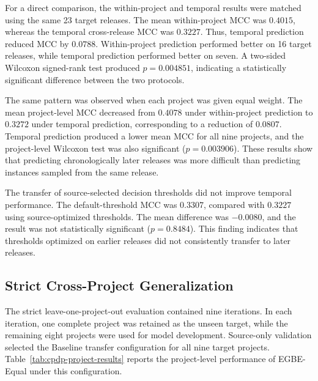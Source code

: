 \documentclass[conference]{IEEEtran}
\begin{document}
For a direct comparison, the within-project and temporal results were
matched using the same 23 target releases. The mean within-project MCC
was \(0.4015\), whereas the temporal cross-release MCC was \(0.3227\).
Thus, temporal prediction reduced MCC by \(0.0788\). Within-project
prediction performed better on 16 target releases, while temporal
prediction performed better on seven. A two-sided Wilcoxon signed-rank
test produced \(p=0.004851\), indicating a statistically significant
difference between the two protocols.

The same pattern was observed when each project was given equal
weight. The mean project-level MCC decreased from \(0.4078\) under
within-project prediction to \(0.3272\) under temporal prediction,
corresponding to a reduction of \(0.0807\). Temporal prediction
produced a lower mean MCC for all nine projects, and the project-level
Wilcoxon test was also significant (\(p=0.003906\)). These results
show that predicting chronologically later releases was more difficult
than predicting instances sampled from the same release.

The transfer of source-selected decision thresholds did not improve
temporal performance. The default-threshold MCC was \(0.3307\),
compared with \(0.3227\) using source-optimized thresholds. The mean
difference was \(-0.0080\), and the result was not statistically
significant (\(p=0.8484\)). This finding indicates that thresholds
optimized on earlier releases did not consistently transfer to later
releases.

\subsection{Strict Cross-Project Generalization}
\label{subsec:strict-cpdp-results}

The strict leave-one-project-out evaluation contained nine iterations.
In each iteration, one complete project was retained as the unseen
target, while the remaining eight projects were used for model
development. Source-only validation selected the Baseline transfer
configuration for all nine target projects. Table~\ref{tab:cpdp-project-results}
reports the project-level performance of EGBE-Equal under this
configuration.
\end{document}
